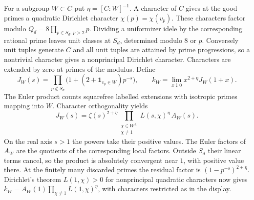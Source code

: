 For a subgroup $W\subset C$ put $\eta=[C:W]^{-1}$. A character of $C$ gives at the good primes a quadratic Dirichlet character $\chi(p)=\chi(v_p)$. These characters factor modulo $Q_d=8\prod_{p\in S_d,\,p>2}p$.
Dividing a uniformizer idele by the corresponding rational prime
leaves unit classes at $S_d$, determined modulo $8$ or $p$. Conversely unit tuples generate $C$ and all unit tuples are attained by prime progressions, so a nontrivial character gives a nonprincipal Dirichlet character. Characters are extended by zero at primes of the modulus. Define
\[
 J_W(s)=\prod_{p\notin S_d}\bigl(1+(2+\mathbf1_{v_p\in W})p^{-s}\bigr),\qquad
 k_W=\lim_{x\downarrow0}x^{2+\eta}J_W(1+x).
\]
The Euler product counts squarefree labelled extensions with
isotropic primes mapping into $W$. Character orthogonality yields
\[
 J_W(s)=\zeta(s)^{2+\eta}
       \prod_{\substack{\chi\in W^\perp\\\chi\ne1}} L(s,\chi)^\eta\,A_W(s).
\]
On the real axis $s>1$ the powers take their positive values. The Euler factors of $A_W$ are the quotients of the corresponding local factors. Outside $S_d$ their linear terms cancel, so the product is absolutely convergent near $1$, with positive value there. At the finitely many discarded primes the residual factor is $(1-p^{-s})^{2+\eta}$. Dirichlet's theorem $L(1,\chi)>0$ for nonprincipal quadratic characters now gives $k_W=A_W(1)\prod_{\chi\ne1}L(1,\chi)^\eta$, with characters restricted as in the display.

